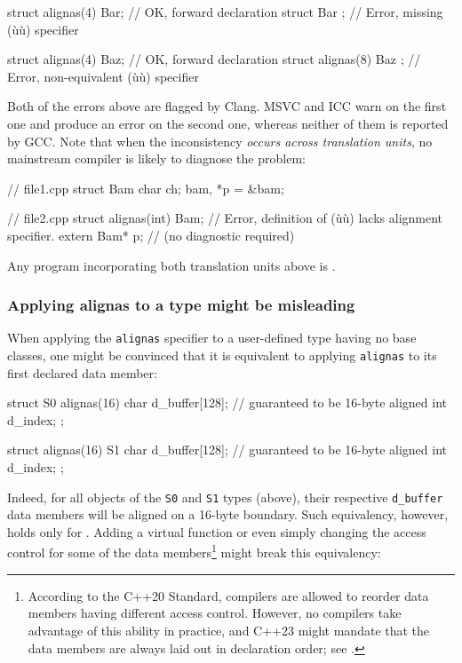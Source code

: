 \begin{emcppslisting}
struct alignas(4) Bar;      // OK, forward declaration
struct Bar { };             // Error, missing (ù{}ù) specifier

struct alignas(4) Baz;      // OK, forward declaration
struct alignas(8) Baz { };  // Error, non-equivalent (ù{}ù) specifier
\end{emcppslisting}

\noindent Both of the errors above are flagged by Clang. MSVC and ICC warn on the first one and produce an error on the second one, whereas neither of them is
reported by GCC. Note that when the inconsistency \emph{occurs across
translation units}, no mainstream compiler is likely to diagnose the
problem:

\begin{emcppslisting}
// file1.cpp
struct Bam { char ch; } bam, *p = &bam;

// file2.cpp
struct alignas(int) Bam;  // Error, definition of (ù{}ù) lacks alignment specifier.
extern Bam* p;            //        (no diagnostic required)
\end{emcppslisting}

\noindent Any program incorporating both translation units above is
.

\subsubsection[Applying \lstinline!alignas! to a \emph{type} might be misleading]{Applying {\SubsubsecCode alignas} to a {\sfbsubsubsecitalRomeo type} might be misleading}\label{applying-alignas-to-a-type-might-be-misleading}

When applying the \lstinline!alignas! specifier to a user-defined type having no base classes, one might be convinced that it is equivalent to applying \lstinline!alignas! to its first declared data member:

\begin{emcppslisting}
struct S0 {
    alignas(16) char d_buffer[128];  // guaranteed to be 16-byte aligned
                int  d_index;
};

struct alignas(16) S1 {
    char d_buffer[128];              // guaranteed to be 16-byte aligned
    int  d_index;
};
\end{emcppslisting}

Indeed, for all objects of the \lstinline!S0! and \lstinline!S1! types (above), their respective \lstinline!d_buffer! data members will be aligned on a 16-byte boundary. Such equivalency, however, holds only for .  Adding a virtual function or even simply changing the access control for some of the data members\footnote{According to the C++20 Standard, compilers are allowed to reorder data members having different access control.  However, no compilers take advantage of this ability in practice, and C++23 might mandate that the data members are always laid out in declaration order; see \cite{balog20}.} might break this equivalency:

